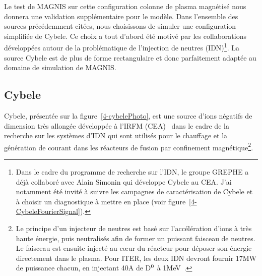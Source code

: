\begin{refsection}
Le test de MAGNIS sur cette configuration colonne de plasma magnétisé nous
donnera une validation supplémentaire pour le modèle. Dans l'ensemble des
sources précédemment citées, nous choisissons de simuler une configuration simplifiée de
Cybele. Ce choix a tout d'abord été motivé par les collaborations
développées autour de la problématique de l'injection
de neutres (IDN)\footnote{Dans le cadre du programme de recherche sur l'IDN,
le groupe GREPHE a déjà collaboré avec Alain Simonin qui développe Cybele au
CEA. J'ai notamment été invité à suivre les campagnes de caractérisation de
Cybele et à choisir un diagnostique à mettre en place (voir
figure~\ref{4-CybeleFourierSignal}).}.
La source Cybele est de plus de forme rectangulaire et donc parfaitement adaptée
au domaine de simulation de MAGNIS.
\newpage

\subsection{Cybele}

Cybele, présentée sur la figure~\ref{4-cybelePhoto}, est une
source d'ions négatifs de dimension très allongée développée à l'IRFM
(CEA)~\cite{Simonin} dans le cadre de la recherche sur les systèmes d'IDN qui sont utilisés pour le chauffage et la génération de
courant dans les réacteurs de fusion par confinement magnétique\footnote{Le principe d'un injecteur de neutres est basé sur l'accélération d'ions à très haute énergie, puis neutralisés afin de former un puissant faisceau de neutres.
Le faisceau est ensuite injecté au c\oe{}ur du réacteur pour déposer son énergie
directement dans le plasma. Pour ITER, les deux IDN devront fournir 17MW de
puissance chacun, en injectant 40A de D$^{{0}}$ à
1MeV~\parencite{Hemsworth}.}.


\end{refsection}
